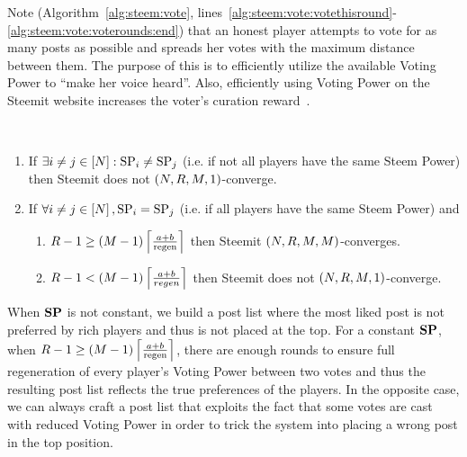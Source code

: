 \documentclass[a4paper,english,cleveref, autoref]{oasics-v2019}
\begin{document}
\begin{remark}
  Note (Algorithm~\ref{alg:steem:vote},
  lines~\ref{alg:steem:vote:votethisround}-\ref{alg:steem:vote:voterounds:end})
  that an honest player attempts to vote for as many posts as possible and
  spreads her votes with the maximum distance between them. The purpose of this
  is to efficiently utilize the available Voting Power to ``make her voice
  heard''. Also, efficiently using Voting Power on the Steemit website increases
  the voter's curation reward~\cite{curationRewards}.
\end{remark}
\begin{theorem}
  \label{theorem:convergence:steem} \
  \begin{enumerate}
    \item \label{theorem:case:varstpow} If $\exists i \neq j \in
    \left[\playerlen\right]: \stpow_i \neq \stpow_j$ (i.e. if not all players
    have the same Steem Power) then Steemit does not $\left(\playerlen, \rounds,
    \postlen, 1\right)$-converge.
    \item If $\forall i \neq j \in \left[\playerlen\right], \stpow_i = \stpow_j$
    (i.e. if all players have the same Steem Power) and
    \begin{enumerate}
      \item \label{theorem:case:manyrounds} $\rounds - 1 \geq \left(\postlen -
      1\right) \ceil*{\frac{a+b}{\regen}}$ then Steemit $\left(\playerlen,
      \rounds, \postlen, \postlen\right)$-converges.
      \item \label{theorem:case:fewrounds} $\rounds - 1 < \left(\postlen -
      1\right) \ceil*{\frac{a+b}{regen}}$ then Steemit does not
      $\left(\playerlen, \rounds,\postlen, 1\right)$-converge.
    \end{enumerate}
  \end{enumerate}
\end{theorem}
\begin{proofsketch}
  When $\stpowvec$ is not constant, we build a post list where the most liked
  post is not preferred by rich players and thus is not placed at the top. For a
  constant $\stpowvec$, when $\rounds - 1 \geq \left(\postlen -
  1\right)\ceil*{\frac{a +b}{\regen}}$, there are enough rounds to ensure full
  regeneration of every player's Voting Power between two votes and thus the
  resulting post list reflects the true preferences of the players. In the
  opposite case, we can always craft a post list that exploits the fact that
  some votes are cast with reduced Voting Power in order to trick the system
  into placing a wrong post in the top position.
\end{proofsketch}
\end{document}
